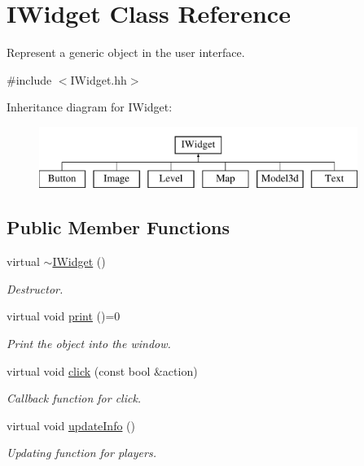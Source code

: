 \hypertarget{classIWidget}{}\section{I\+Widget Class Reference}
\label{classIWidget}


Represent a generic object in the user interface.  




{\ttfamily \#include $<$I\+Widget.\+hh$>$}

Inheritance diagram for I\+Widget\+:\begin{figure}[H]
\begin{center}
\leavevmode
\includegraphics[height=2.000000cm]{classIWidget}
\end{center}
\end{figure}
\subsection*{Public Member Functions}
\begin{DoxyCompactItemize}
\item 
\mbox{\label{classIWidget_ad733ed972c58c5c6268b57e2f4381666}} 
virtual \hyperlink{classIWidget_ad733ed972c58c5c6268b57e2f4381666}{$\sim$\+I\+Widget} ()
\begin{DoxyCompactList}\small\item\em Destructor. \end{DoxyCompactList}\item 
\mbox{\label{classIWidget_ad59738ae1350ed490fdbe07cd1ab4daa}} 
virtual void \hyperlink{classIWidget_ad59738ae1350ed490fdbe07cd1ab4daa}{print} ()=0
\begin{DoxyCompactList}\small\item\em Print the object into the window. \end{DoxyCompactList}\item 
\mbox{\label{classIWidget_aad57c02a26653bff50e9db5910bd6b04}} 
virtual void \hyperlink{classIWidget_aad57c02a26653bff50e9db5910bd6b04}{click} (const bool \&action)
\begin{DoxyCompactList}\small\item\em Callback function for click. \end{DoxyCompactList}\item 
\mbox{\label{classIWidget_a3b3b29421e5b1857c17a3e8999b55121}} 
virtual void \hyperlink{classIWidget_a3b3b29421e5b1857c17a3e8999b55121}{update\+Info} ()
\begin{DoxyCompactList}\small\item\em Updating function for players. \end{DoxyCompactList}\end{DoxyCompactItemize}


